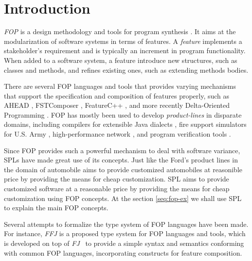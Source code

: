 \chapter{Introduction}
\textit{\gls{FOP}} \cite{prehofer_feature-oriented_1997} is a design methodology and tools for program synthesis \cite{batory_tutorial_2003}.
It aims at the modularization of software systems in terms of features. A \textit{feature}
implements a stakeholder's requirement and is typically an increment in program functionality.
When added to a software system, a feature introduce new structures, such as classes and methods,
and refines existing ones, such as extending methods bodies.

There are several \gls{FOP} languages and tools that provides varying mechanisms
that support the specification and composition of features properly, such as AHEAD \cite{batory_feature-oriented_2004},
FSTComposer \cite{apel_superimposition:_2008}, FeatureC++ \cite{apel_featurec++:_2005}, and more recently Delta-Oriented Programming \cite{schaefer_delta-oriented_2010}. \gls{FOP} has mostly been used to develop
\textit{product-lines} in disparate domains, including compilers for extensible Java dialects 
\cite{batory_jts:_1998}, fire support simulators for U.S. Army \cite{batory_achieving_2000}, high-performance network
\cite{batory_design_1992}, and program verification tools \cite{kurt_stirewalt_component-based_2001}.

Since \gls{FOP} provides such a powerful mechanism to deal with software variance, \glspl{SPL} have made great use of its concepts.
Just like the Ford's product lines in the domain of automobile aims to provide customized automobiles at reasonible price by providing
the means for cheap customization. \gls{SPL} aims to provide customized software at a reasonable price by providing the means for cheap customization using
\gls{FOP} concepts. At the section \ref{seq:fop-ex} we shall use \gls{SPL} to explain the main \gls{FOP} concepts.

Several attempts to formalize the type system of \gls{FOP} languages have been made. %
For instance,  \textit{\gls{FFJ}} \cite{apel_feature_2008} is a proposed type system for \gls{FOP} languages and tools, 
which is developed on top of \textit{\gls{FJ}}~\cite{igarashi_featherweight_2001}
to provide a simple syntax and semantics conforming with common \gls{FOP} languages, 
incorporating constructs for feature composition. %

